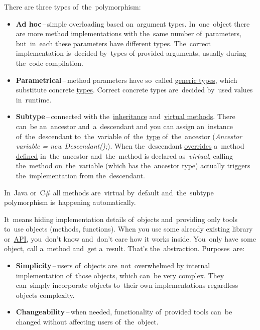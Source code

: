 \noindent There are three types of~the~polymorphism:
\begin{itemize}
    \item \textbf{Ad hoc}\,--\,simple overloading based on~argument types. In~one~object there are more method implementations with the~same number of~parameters, but~in~each these parameters have different types. The~correct implementation is~decided by~types of provided arguments, usually during the~code compilation.
    \item \textbf{Parametrical}\,--\,method parameters have so~called \hyperref[javagenerics]{generic types}, which substitute concrete \hyperref[datatypes]{types}. Correct concrete types are~decided by~used values in~runtime.
    \item \textbf{Subtype}\,--\,connected with the~\hyperref[inheritance]{inheritance} and~\hyperref[virtualmethod]{virtual methods}. There can~be an~ancestor and~a~descendant and you can assign an~instance of~the~descendant to~the~variable of~the~\hyperref[datatype]{type} of~the~ancestor (\textit{Ancestor variable = new Descendant();}). When the~descendant \hyperref[javaoverride]{overrides} a~method \hyperref[declarationdefinition]{defined} in~the~ancestor and~the~method is declared as~\textit{virtual}, calling the~method on~the~variable (which has the~ancestor type) actually triggers the~implementation from the~descendant.
\end{itemize}

\warning In~Java or~C\# all methods are~virtual by~default and~the~subtype polymorphism is~happening automatically.

\label{abstraction}
It~means hiding implementation details of~objects and~providing only tools to~use objects (methods, functions). When you use some already existing library or~\hyperref[api]{API}, you~don't know and~don't care how it works inside. You~only have some object, call a~method and~get a~result. That's the~abstraction. Purposes~are:
\begin{itemize}
    \item \textbf{Simplicity}\,--\,users of~objects are~not~overwhelmed by internal implementation of~those objects, which can~be very complex. They can~simply incorporate objects to~their own implementations regardless objects complexity.
    \item \textbf{Changeability}\,--\,when needed, functionality of~provided tools can~be changed without affecting users of~the~object.
\end{itemize}

